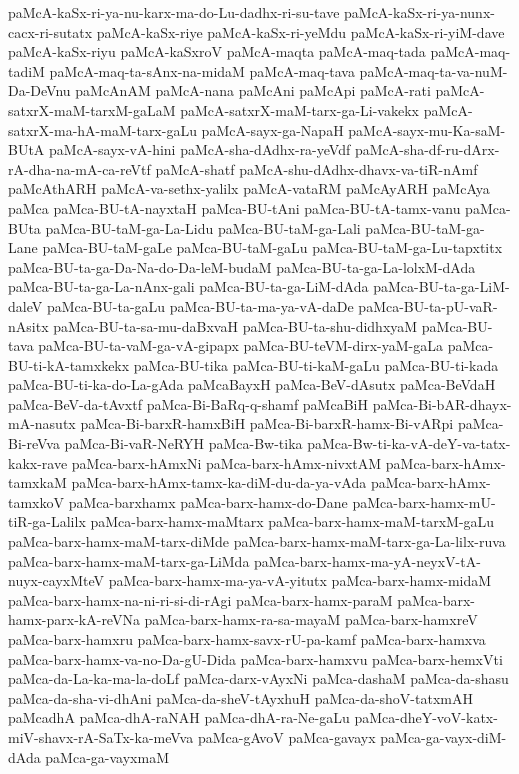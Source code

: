 {paMcA-kaSx-ri-ya-nu-karx-ma-do-Lu-dadhx-ri-su-tave
paMcA-kaSx-ri-ya-nunx-cacx-ri-sutatx
paMcA-kaSx-riye
paMcA-kaSx-ri-yeMdu
paMcA-kaSx-ri-yiM-dave
paMcA-kaSx-riyu
paMcA-kaSxroV
paMcA-maqta
paMcA-maq-tada
paMcA-maq-tadiM
paMcA-maq-ta-sAnx-na-midaM
paMcA-maq-tava
paMcA-maq-ta-va-nuM-Da-DeVnu
paMcAnAM
paMcA-nana
paMcAni
paMcApi
paMcA-rati
paMcA-satxrX-maM-tarxM-gaLaM
paMcA-satxrX-maM-tarx-ga-Li-vakekx
paMcA-satxrX-ma-hA-maM-tarx-gaLu
paMcA-sayx-ga-NapaH
paMcA-sayx-mu-Ka-saM-BUtA
paMcA-sayx-vA-hini
paMcA-sha-dAdhx-ra-yeVdf
paMcA-sha-df-ru-dArx-rA-dha-na-mA-ca-reVtf
paMcA-shatf
paMcA-shu-dAdhx-dhavx-va-tiR-nAmf
paMcAthARH
paMcA-va-sethx-yalilx
paMcA-vataRM
paMcAyARH
paMcAya
paMca
paMca-BU-tA-nayxtaH
paMca-BU-tAni
paMca-BU-tA-tamx-vanu
paMca-BUta
paMca-BU-taM-ga-La-Lidu
paMca-BU-taM-ga-Lali
paMca-BU-taM-ga-Lane
paMca-BU-taM-gaLe
paMca-BU-taM-gaLu
paMca-BU-taM-ga-Lu-tapxtitx
paMca-BU-ta-ga-Da-Na-do-Da-leM-budaM
paMca-BU-ta-ga-La-lolxM-dAda
paMca-BU-ta-ga-La-nAnx-gali
paMca-BU-ta-ga-LiM-dAda
paMca-BU-ta-ga-LiM-daleV
paMca-BU-ta-gaLu
paMca-BU-ta-ma-ya-vA-daDe
paMca-BU-ta-pU-vaR-nAsitx
paMca-BU-ta-sa-mu-daBxvaH
paMca-BU-ta-shu-didhxyaM
paMca-BU-tava
paMca-BU-ta-vaM-ga-vA-gipapx
paMca-BU-teVM-dirx-yaM-gaLa
paMca-BU-ti-kA-tamxkekx
paMca-BU-tika
paMca-BU-ti-kaM-gaLu
paMca-BU-ti-kada
paMca-BU-ti-ka-do-La-gAda
paMcaBayxH
paMca-BeV-dAsutx
paMca-BeVdaH
paMca-BeV-da-tAvxtf
paMca-Bi-BaRq-q-shamf
paMcaBiH
paMca-Bi-bAR-dhayx-mA-nasutx
paMca-Bi-barxR-hamxBiH
paMca-Bi-barxR-hamx-Bi-vARpi
paMca-Bi-reVva
paMca-Bi-vaR-NeRYH
paMca-Bw-tika
paMca-Bw-ti-ka-vA-deY-va-tatx-kakx-rave
paMca-barx-hAmxNi
paMca-barx-hAmx-nivxtAM
paMca-barx-hAmx-tamxkaM
paMca-barx-hAmx-tamx-ka-diM-du-da-ya-vAda
paMca-barx-hAmx-tamxkoV
paMca-barxhamx
paMca-barx-hamx-do-Dane
paMca-barx-hamx-mU-tiR-ga-Lalilx
paMca-barx-hamx-maMtarx
paMca-barx-hamx-maM-tarxM-gaLu
paMca-barx-hamx-maM-tarx-diMde
paMca-barx-hamx-maM-tarx-ga-La-lilx-ruva
paMca-barx-hamx-maM-tarx-ga-LiMda
paMca-barx-hamx-ma-yA-neyxV-tA-nuyx-cayxMteV
paMca-barx-hamx-ma-ya-vA-yitutx
paMca-barx-hamx-midaM
paMca-barx-hamx-na-ni-ri-si-di-rAgi
paMca-barx-hamx-paraM
paMca-barx-hamx-parx-kA-reVNa
paMca-barx-hamx-ra-sa-mayaM
paMca-barx-hamxreV
paMca-barx-hamxru
paMca-barx-hamx-savx-rU-pa-kamf
paMca-barx-hamxva
paMca-barx-hamx-va-no-Da-gU-Dida
paMca-barx-hamxvu
paMca-barx-hemxVti
paMca-da-La-ka-ma-la-doLf
paMca-darx-vAyxNi
paMca-dashaM
paMca-da-shasu
paMca-da-sha-vi-dhAni
paMca-da-sheV-tAyxhuH
paMca-da-shoV-tatxmAH
paMcadhA
paMca-dhA-raNAH
paMca-dhA-ra-Ne-gaLu
paMca-dheY-voV-katx-miV-shavx-rA-SaTx-ka-meVva
paMca-gAvoV
paMca-gavayx
paMca-ga-vayx-diM-dAda
paMca-ga-vayxmaM
}
